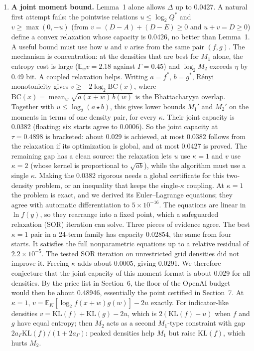 \documentclass[11pt]{article}
\DeclareMathOperator{\mean}{mean}
\newcommand{\E}{\mathbb{E}}
\newcommand{\KL}{\mathrm{KL}}
\theoremstyle{plain}
\begin{document}
\begin{enumerate}
\item \textbf{A joint moment bound.} Lemma~1 alone allows $\Delta$ up to 0.0427. A natural first attempt fails: the pointwise relations $u \le \log_2 Q^*$ and $v \ge \max(0, -u)$ (from $v = (D-A) + (D-E) \ge 0$ and $u + v = D \ge 0$) define a convex relaxation whose capacity is 0.0426, no better than Lemma~1. A useful bound must use how $u$ and $v$ arise from the same pair $(f, g)$. The mechanism is concentration: at the densities that are best for $M_1$ alone, the entropy cost is large ($\E_w v = 2.18$ against $\Gamma = 0.45$) and $\log_2 M_2$ exceeds $\eta$ by 0.49 bit. A coupled relaxation helps. Writing $a = f^*$, $b = g^*$, R\'enyi monotonicity gives $v \ge -2 \log_2 \mathrm{BC}(x)$, where $\mathrm{BC}(x) = \mean_w \sqrt{a(x+w)\, b(w)}$ is the Bhattacharyya overlap. Together with $u \le \log_2 (a \star b)$, this gives lower bounds $M_1'$ and $M_2'$ on the moments in terms of one density pair, for every $\kappa$. Their joint capacity is 0.0382 (floating; six starts agree to 0.0006). So the joint capacity at $\tau = 0.4898$ is bracketed: about 0.029 is achieved, at most 0.0382 follows from the relaxation if its optimization is global, and at most 0.0427 is proved. The remaining gap has a clean source: the relaxation lets $u$ use $\kappa = 1$ and $v$ use $\kappa = 2$ (whose kernel is proportional to $\sqrt{ab}$), while the algorithm must use a single $\kappa$. Making the 0.0382 rigorous needs a global certificate for this two-density problem, or an inequality that keeps the single-$\kappa$ coupling. At $\kappa = 1$ the problem is exact, and we derived its Euler--Lagrange equations; they agree with automatic differentiation to $5\times10^{-16}$. The equations are linear in $\ln f(y)$, so they rearrange into a fixed point, which a safeguarded relaxation (SOR) iteration can solve. Three pieces of evidence agree. The best $\kappa = 1$ pair in a 24-term family has capacity 0.02854, the same from four starts. It satisfies the full nonparametric equations up to a relative residual of $2.2\times10^{-5}$. The tested SOR iteration on unrestricted grid densities did not improve it. Freeing $\kappa$ adds about 0.0005, giving 0.0291. We therefore conjecture that the joint capacity of this moment format is about 0.029 for all densities. By the price list in Section~6, the floor of the OpenAI budget would then be about 0.48946, essentially the point certified in Section~7. At $\kappa = 1$, $v = \E_K[\log_2 f(x+w)g(w)] - 2u$ exactly. For indicator-like densities $v = \KL(f) + \KL(g) - 2u$, which is $2(\KL(f) - u)$ when $f$ and $g$ have equal entropy; then $M_2$ acts as a second $M_1$-type constraint with gap $2a_\Gamma \KL(f)/(1+2a_\Gamma)$: peaked densities help $M_1$ but raise $\KL(f)$, which hurts $M_2$.

\end{enumerate}
\end{document}
